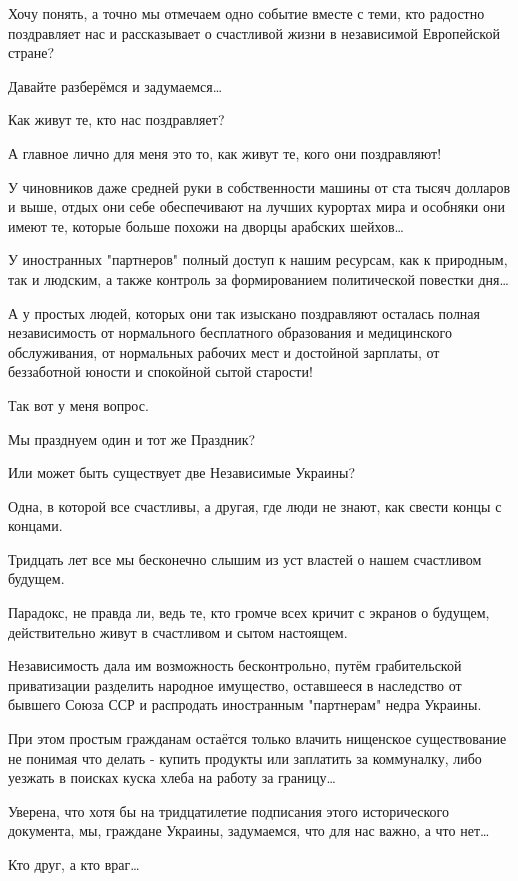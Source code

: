 Хочу понять, а точно мы отмечаем одно событие вместе с теми, кто радостно
поздравляет нас и рассказывает  о счастливой жизни в независимой Европейской
стране?

Давайте разберёмся и задумаемся… 

Как живут те, кто нас поздравляет? 

А главное  лично для меня это то, как живут те, кого они поздравляют! 

У чиновников даже средней руки в собственности  машины от ста тысяч долларов и
выше, отдых они себе обеспечивают на лучших курортах мира и особняки они имеют
те, которые больше похожи на дворцы арабских шейхов… 

У иностранных "партнеров"  полный доступ к нашим ресурсам, как к природным, так
и людским, а также контроль за формированием политической повестки дня… 

А у простых людей, которых они так изыскано поздравляют осталась полная
независимость от нормального бесплатного образования и медицинского
обслуживания, от нормальных рабочих мест и достойной зарплаты, от беззаботной
юности и спокойной сытой старости!

Так вот у меня вопрос. 

Мы празднуем один и тот же Праздник?

Или может быть существует две Независимые Украины? 

Одна, в которой все счастливы, а другая, где люди не знают, как свести концы с
концами. 

Тридцать лет все  мы бесконечно слышим из уст властей о нашем счастливом
будущем.

Парадокс, не правда ли, ведь те, кто громче всех кричит с экранов о будущем,
действительно живут в счастливом и сытом настоящем. 

Независимость  дала им возможность бесконтрольно, путём грабительской
приватизации  разделить народное имущество, оставшееся в наследство от бывшего
Союза ССР и распродать иностранным "партнерам" недра Украины. 

При этом  простым гражданам остаётся только влачить нищенское существование не
понимая что делать - купить продукты  или заплатить за коммуналку, либо уезжать
в поисках куска хлеба на работу за границу… 

Уверена, что хотя бы на тридцатилетие подписания этого исторического документа,
мы, граждане Украины, задумаемся, что для нас важно, а что нет… 

Кто друг, а кто враг… 

